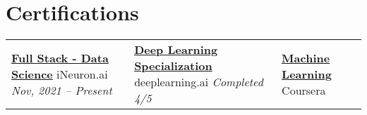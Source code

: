 \documentclass[letterpaper,11pt]{article}
\begin{document}
\section{Certifications}
 \begin{itemize}[leftmargin=0.15in, label={}]

\begin{tabularx}{\linewidth}{ @{} X X X @{} }
    \href{https://ineuron.ai/course/Full-Stack-Data-Science-Nov'21-Batch}
    {\bfseries{Full Stack - Data Science}}\hfill \break
    iNeuron.ai\hfill \break
    {\textit{Nov, 2021 -- Present}}

    &
    
    \href{https://drive.google.com/file/d/1nlAGjIDLMqbXyDVl-Py22eLMO2MyzlGz/view?usp=sharing}
    {\bfseries{Deep Learning Specialization}}\hfill \break
    deeplearning.ai\hfill \break
    {\textit{Completed 4/5}}

    &
    
    \href{https://www.coursera.org/learn/machine-learning}
    {\bfseries{Machine Learning}}\hfill \break
    Coursera
\end{tabularx}
 \end{itemize}

\end{document}
